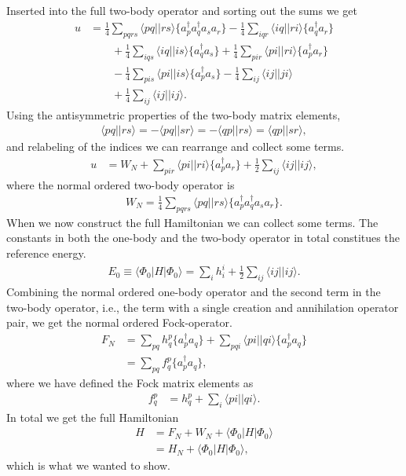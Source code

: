 \documentclass[
    a4paper, aps, twocolumn, floatfix, superscriptaddress,
    nofootinbib]{revtex4-1}
\newcommand{\1}{\mathds{1}}
\newcommand{\half}{\frac{1}{2}}
\newcommand{\bra}[1]{\langle #1\lvert}
\newcommand{\ket}[1]{\rvert #1\rangle}
\newcommand{\acr}[1]{a_{#1}^{\dagger}}
\newcommand{\ade}[1]{a_{#1}}
\newcommand{\kslat}{\ket{\Phi_0}}
\newcommand{\bslat}{\bra{\Phi_0}}
\begin{document}
    Inserted into the full two-body operator and sorting out the sums we get
    \begin{align}
        u
        &=
        \frac{1}{4}\sum_{pqrs}\bra{pq}\ket{rs}
        \{\acr{p}\acr{q}\ade{s}\ade{r}\}
        - \frac{1}{4}\sum_{iqr}\bra{iq}\ket{ri}\{\acr{q}\ade{r}\}
        \nonumber \\
        &\qquad
        + \frac{1}{4}\sum_{iqs}\bra{iq}\ket{is}\{\acr{q}\ade{s}\}
        + \frac{1}{4}\sum_{pir}\bra{pi}\ket{ri}\{\acr{p}\ade{r}\}
        \nonumber \\
        &\qquad
        - \frac{1}{4}\sum_{pis}\bra{pi}\ket{is}\{\acr{p}\ade{s}\}
        - \frac{1}{4}\sum_{ij}\bra{ij}\ket{ji}
        \nonumber \\
        &\qquad
        + \frac{1}{4}\sum_{ij}\bra{ij}\ket{ij}.
    \end{align}
    Using the antisymmetric properties of the two-body matrix elements,
    \begin{align}
        \bra{pq}\ket{rs}
        = - \bra{pq}\ket{sr}
        = - \bra{qp}\ket{rs}
        = \bra{qp}\ket{sr},
    \end{align}
    and relabeling of the indices we can rearrange and collect some terms.
    \begin{align}
        u
        &=
        W_N + \sum_{pir}\bra{pi}\ket{ri}\{\acr{p}\ade{r}\}
        + \half\sum_{ij}\bra{ij}\ket{ij},
    \end{align}
    where the normal ordered two-body operator is
    \begin{align}
        W_N = \frac{1}{4}\sum_{pqrs}
        \bra{pq}\ket{rs}\{\acr{p}\acr{q}\ade{s}\ade{r}\}.
    \end{align}
    When we now construct the full Hamiltonian we can collect some terms. The
    constants in both the one-body and the two-body operator in total constitues
    the reference energy.
    \begin{align}
        E_0 \equiv \bslat H\kslat
        = \sum_{i}h_i^i + \frac{1}{2}\sum_{ij}\bra{ij}\ket{ij}.
        \label{eq:reference_energy}
    \end{align}
    Combining the normal ordered one-body operator and the second term in the
    two-body operator, i.e., the term with a single creation and annihilation
    operator pair, we get the normal ordered Fock-operator.
    \begin{align}
        F_N
        &=
        \sum_{pq}h_{q}^{p}\{\acr{p}\ade{q}\}
        + \sum_{pqi}\bra{pi}\ket{qi}\{\acr{p}\ade{q}\}
        \\
        &= \sum_{pq}f_{q}^{p}\{\acr{p}\ade{q}\},
    \end{align}
    where we have defined the Fock matrix elements as
    \begin{align}
        f_{q}^{p}
        &=
        h_q^p + \sum_{i}\bra{pi}\ket{qi}.
    \end{align}
    In total we get the full Hamiltonian
    \begin{align}
        H
        &=
        F_N + W_N + \bslat H\kslat
        \\
        &= H_N + \bslat H\kslat,
    \end{align}
    which is what we wanted to show.\cite{crawford2007introduction}
\end{document}
